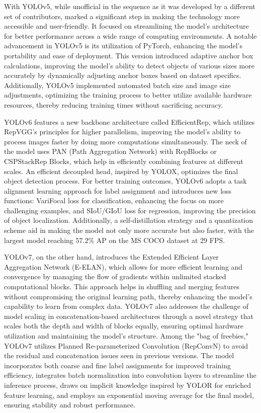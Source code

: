 With YOLOv5, while unofficial in the sequence as it was developed by a different set of contributors, marked a significant step in making the technology more accessible and user-friendly. It focused on streamlining the model's architecture for better performance across a wide range of computing environments. A notable advancement in YOLOv5 is its utilization of PyTorch, enhancing the model's portability and ease of deployment. This version introduced adaptive anchor box calculations, improving the model's ability to detect objects of various sizes more accurately by dynamically adjusting anchor boxes based on dataset specifics. Additionally, YOLOv5 implemented automated batch size and image size adjustments, optimizing the training process to better utilize available hardware resources, thereby reducing training times without sacrificing accuracy.

YOLOv6 \cite{li2022yolov6} features a new backbone architecture called EfficientRep, which utilizes RepVGG's principles for higher parallelism, improving the model's ability to process images faster by doing more computations simultaneously. The neck of the model uses PAN (Path Aggregation Network) with RepBlocks or CSPStackRep Blocks, which help in efficiently combining features at different scales. An efficient decoupled head, inspired by YOLOX, optimizes the final object detection process. For better training outcomes, YOLOv6 adopts a task alignment learning approach for label assignment and introduces new loss functions: VariFocal loss for classification, enhancing the focus on more challenging examples, and SIoU/GIoU loss for regression, improving the precision of object localization. Additionally, a self-distillation strategy and a quantization scheme aid in making the model not only more accurate but also faster, with the largest model reaching $57.2\%$ AP on the MS COCO dataset at 29 FPS.

YOLOv7, on the other hand, introduces the Extended Efficient Layer Aggregation Network (E-ELAN), which allows for more efficient learning and convergence by managing the flow of gradients within unlimited stacked computational blocks. This approach helps in shuffling and merging features without compromising the original learning path, thereby enhancing the model's capability to learn from complex data. YOLOv7 also addresses the challenge of model scaling in concatenation-based architectures through a novel strategy that scales both the depth and width of blocks equally, ensuring optimal hardware utilization and maintaining the model's structure. Among the "bag of freebies," YOLOv7 utilizes Planned Re-parameterized Convolution (RepConvN) to avoid the residual and concatenation issues seen in previous versions. The model incorporates both coarse and fine label assignments for improved training efficiency, integrates batch normalization into convolution layers to streamline the inference process, draws on implicit knowledge inspired by YOLOR for enriched feature learning, and employs an exponential moving average for the final model, ensuring stability and robust performance.



